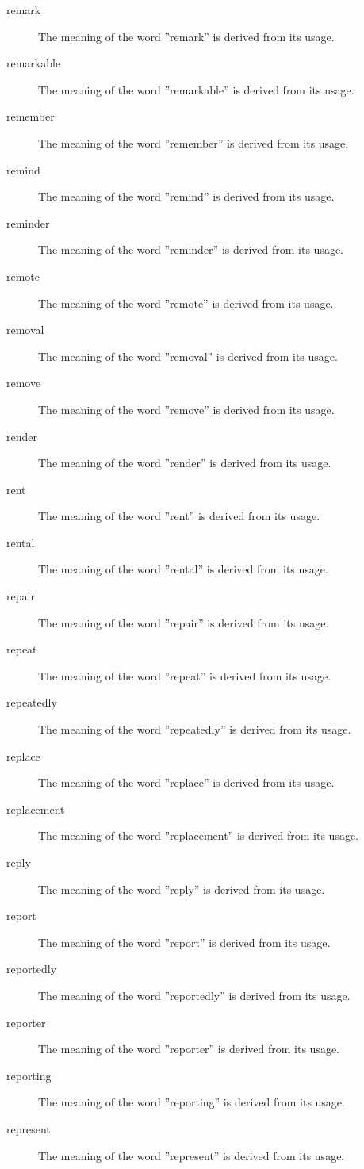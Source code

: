 \documentclass[12pt, letterpaper]{memoir}
\begin{document}
\begin{description}
\item[remark] The meaning of the word ''remark'' is derived from its usage.
\item[remarkable] The meaning of the word ''remarkable'' is derived from its usage.
\item[remember] The meaning of the word ''remember'' is derived from its usage.
\item[remind] The meaning of the word ''remind'' is derived from its usage.
\item[reminder] The meaning of the word ''reminder'' is derived from its usage.
\item[remote] The meaning of the word ''remote'' is derived from its usage.
\item[removal] The meaning of the word ''removal'' is derived from its usage.
\item[remove] The meaning of the word ''remove'' is derived from its usage.
\item[render] The meaning of the word ''render'' is derived from its usage.
\item[rent] The meaning of the word ''rent'' is derived from its usage.
\item[rental] The meaning of the word ''rental'' is derived from its usage.
\item[repair] The meaning of the word ''repair'' is derived from its usage.
\item[repeat] The meaning of the word ''repeat'' is derived from its usage.
\item[repeatedly] The meaning of the word ''repeatedly'' is derived from its usage.
\item[replace] The meaning of the word ''replace'' is derived from its usage.
\item[replacement] The meaning of the word ''replacement'' is derived from its usage.
\item[reply] The meaning of the word ''reply'' is derived from its usage.
\item[report] The meaning of the word ''report'' is derived from its usage.
\item[reportedly] The meaning of the word ''reportedly'' is derived from its usage.
\item[reporter] The meaning of the word ''reporter'' is derived from its usage.
\item[reporting] The meaning of the word ''reporting'' is derived from its usage.
\item[represent] The meaning of the word ''represent'' is derived from its usage.

\end{description}
\end{document}
